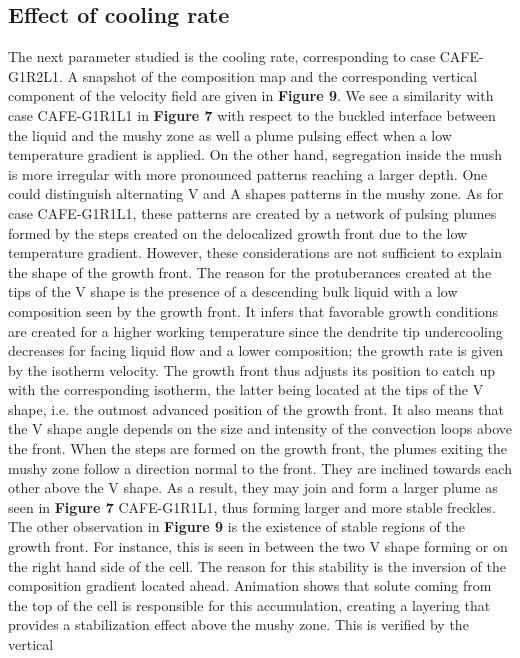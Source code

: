 \subsection{Effect of cooling rate}
The next parameter studied is the cooling rate, corresponding to case CAFE-G1R2L1. A snapshot of the composition map 
and the corresponding vertical component of the velocity field are given in \textbf{Figure 9}. We see a similarity 
with case CAFE-G1R1L1 in \textbf{Figure 7} with respect to the buckled interface between the liquid and the mushy 
zone as well a plume pulsing effect when a low temperature gradient is applied. On the other hand, segregation inside 
the mush is more irregular with more pronounced patterns reaching a larger depth. One could distinguish alternating V  
and A shapes patterns in the mushy zone. As for case CAFE-G1R1L1, these patterns are created by a network of pulsing 
plumes formed by the steps created on the delocalized growth front due to the low temperature gradient. However, these 
considerations are not sufficient to explain the shape of the growth front. The reason for the protuberances created at 
the tips of the V shape is the presence of a descending bulk liquid with a low composition seen by the growth front. It 
infers that favorable growth conditions are created for a higher working temperature since the dendrite tip undercooling 
decreases for facing liquid flow and a lower composition; the growth rate is given by the isotherm velocity. The growth 
front thus adjusts its position to catch up with the corresponding isotherm, the latter being located at the tips of the 
V shape, i.e. the outmost advanced position of the growth front. It also means that the V shape angle depends on the size 
and intensity of the convection loops above the front. When the steps are formed on the growth front, the plumes exiting 
the mushy zone follow a direction normal to the front. They are inclined towards each other above the V shape. As a result, 
they may join and form a larger plume as seen in \textbf{Figure 7} CAFE-G1R1L1, thus forming larger and more stable freckles. 
The other observation in \textbf{Figure 9} is the existence of stable regions of the growth front. For instance, this is seen 
in between the two V shape forming or on the right hand side of the cell. The reason for this stability is the inversion of 
the composition gradient located ahead. Animation shows that solute coming from the top of the cell is responsible for this 
accumulation, creating a layering that provides a stabilization effect above the mushy zone. This is verified by the vertical 
